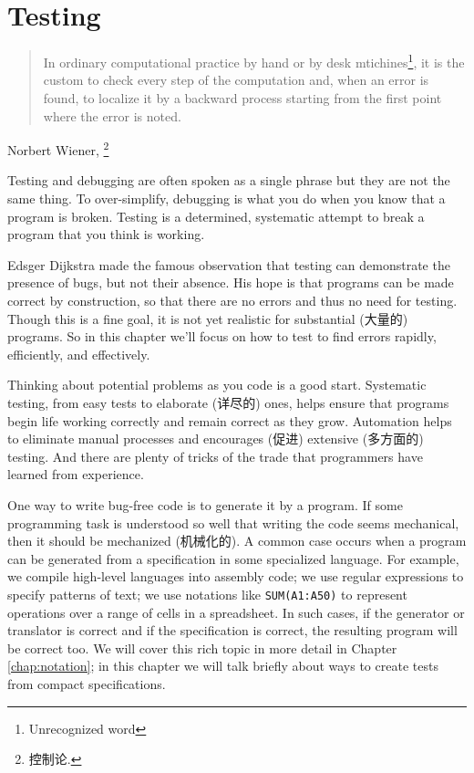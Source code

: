\chapter{Testing}
\label{chap:testing}
\begin{quote}
    In ordinary computational practice by hand or by desk
    mtichines\footnote{Unrecognized word}, it is the custom to check every
    step of the computation and, when an error is found, to localize it by
    a backward process starting from the first point where the error is
    noted.
\end{quote}
\begin{quotesrc}
    Norbert Wiener, \footnote{控制论.}
\end{quotesrc}

Testing and debugging are often spoken as a single phrase but they are not
the same thing. To over-simplify, debugging is what you do when you know
that a program is broken. Testing is a determined, systematic attempt to
break a program that you think is working.

Edsger Dijkstra made the famous observation that testing can demonstrate
the presence of bugs, but not their absence. His hope is that programs can
be made correct by construction, so that there are no errors and thus no
need for testing. Though this is a fine goal, it is not yet realistic for
substantial (大量的) programs. So in this chapter we'll focus on how to
test to find errors rapidly, efficiently, and effectively.

Thinking about potential problems as you code is a good start. Systematic
testing, from easy tests to elaborate (详尽的) ones, helps ensure that
programs begin life working correctly and remain correct as they grow.
Automation helps to eliminate manual processes and encourages (促进)
extensive (多方面的) testing. And there are plenty of tricks of the trade
that programmers have learned from experience.

One way to write bug-free code is to generate it by a program. If some
programming task is understood so well that writing the code seems
mechanical, then it should be mechanized (机械化的). A common case occurs
when a program can be generated from a specification in some specialized
language. For example, we compile high-level languages into assembly code;
we use regular expressions to specify patterns of text; we use notations
like \verb'SUM(A1:A50)' to represent operations over a range of cells in a
spreadsheet. In such cases, if the generator or translator is correct and
if the specification is correct, the resulting program will be correct too.
We will cover this rich topic in more detail in Chapter
\ref{chap:notation}; in this chapter we will talk briefly about ways to
create tests from compact specifications.

